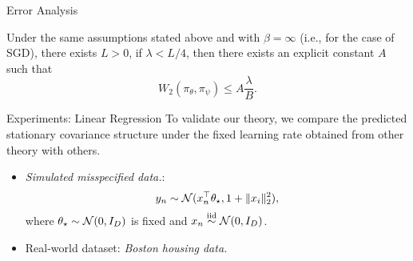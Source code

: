 \documentclass[10pt,xcolor=table]{beamer}
\begin{document}
\begin{frame}{Error Analysis}
\begin{corollary} \label{cor:stationary-wasserstein-error-bound} 
	Under the same assumptions stated above and with $\beta = \infty$ (i.e., for the case of SGD), there exists $L>0$, if $\lambda < L/4$, then 
	there exists an explicit constant $A$ such that 
	\[
	W_{2}(\pi_{\theta}, \pi_{\psi}) \le A\frac{\lambda}{B}.
	\]
\end{corollary}
\end{frame}

\begin{frame}{Experiments: Linear Regression}
To validate our theory, we compare the predicted stationary covariance structure under the fixed learning rate obtained from other theory with others.
\begin{itemize}
	\item \emph{Simulated misspecified data.}:
	\begin{equation*}
		\label{eq: linear regression misspecified model}
		y_{n} \sim \mathcal{N}(x_{n}^{\top}\theta_{\star}, 1+\|x_{i}\|_{2}^{2}),
	\end{equation*}
	where $\theta_{\star} \sim \mathcal{N}(0, I_{D})$ is fixed and $x_{n} \overset{\text{iid}}{\sim} \mathcal{N}(0, I_{D})$.
	\item Real-world dataset: \emph{Boston housing data.}
\end{itemize}
\end{frame}
\end{document}

